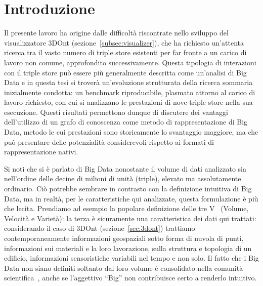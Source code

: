 \chapter{Introduzione}
\label{cha:introduction}

Il presente lavoro ha origine dalle difficoltà riscontrate nello sviluppo del visualizzatore 3DOnt (sezione~\ref{subsec:visualizer}),
che ha richiesto un'attenta ricerca tra il vasto numero di triple store esistenti per far fronte a un carico di lavoro
non comune, approfondito successivamente.
Questa tipologia di interazioni con il triple store può essere più generalmente descritta come un'analisi di Big Data e in questa tesi
si troverà un'evoluzione strutturata della ricerca sommaria inizialmente condotta: un benchmark riproducibile,
plasmato attorno al carico di lavoro richiesto, con cui si analizzano le prestazioni di nove triple store
nella sua esecuzione.
Questi risultati permettono dunque di discutere dei vantaggi dell'utilizzo di un grafo di conoscenza come metodo di
rappresentazione di Big Data, metodo le cui prestazioni sono storicamente lo svantaggio maggiore, ma che può presentare
delle potenzialità considerevoli rispetto ai formati di rappresentazione nativi.

\par Si noti che si è parlato di Big Data nonostante il volume di dati analizzato sia nell'ordine delle decine di milioni
di unità (triple), elevato ma assolutamente ordinario. Ciò potrebbe sembrare in contrasto con la definizione intuitiva di Big
Data, ma in realtà, per le caratteristiche qui analizzate, questa formulazione è più che lecita. Prendiamo ad esempio la
popolare definizione delle tre V~\cite{laney2001threev} (Volume, Velocità e Varietà): la terza è sicuramente una caratteristica dei
dati qui trattati: considerando il caso di 3DOnt (sezione~\ref{sec:3dont}) trattiamo contemporaneamente informazioni geospaziali sotto
forma di nuvola di punti, informazioni sui materiali e la loro lavorazione, sulla struttura e topologia di un edificio, 
informazioni sensoristiche variabili nel tempo e non solo. 
Il fatto che i Big Data non siano definiti soltanto dal loro volume è consolidato nella comunità scientifica~\cite{kitchin2013bigdata},
anche se l'aggettivo ``Big'' non contribuisce certo a renderlo intuitivo.


